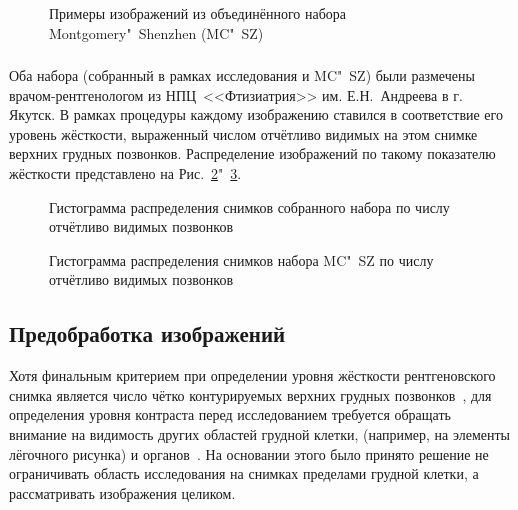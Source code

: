 \begin{figure}[ht]
	\caption{Примеры изображений из объединённого набора Montgomery"~Shenzhen (MC"~SZ)}
	\label{fig:samples-mc-sz}
\end{figure}

\subsubsection{}

Оба набора (собранный в рамках исследования и MC"~SZ) были размечены врачом-рентгенологом из НПЦ~<<Фтизиатрия>> им. Е.Н.~Андреева в г. Якутск. В рамках процедуры каждому изображению ставился в соответствие его уровень жёсткости, выраженный числом отчётливо видимых на этом снимке верхних грудных позвонков.  Распределение изображений по такому показателю жёсткости представлено на Рис.~\ref{fig:vertebrae-yak-hardness}"~\ref{fig:vertebrae-mc-sz}.

\begin{figure}[ht]
	\caption{Гистограмма распределения снимков собранного набора по числу отчётливо видимых позвонков}
	\label{fig:vertebrae-yak-hardness}
\end{figure}

\begin{figure}[ht]
	\caption{Гистограмма распределения снимков набора MC"~SZ по числу отчётливо видимых позвонков}
	\label{fig:vertebrae-mc-sz}
\end{figure}

\subsection{Предобработка изображений} \label{subsec:tb-hardness-preprocessing}

Хотя финальным критерием при определении уровня жёсткости рентгеновского снимка является число чётко контурируемых верхних грудных позвонков~\cite{тимофеева2013основные, сидоров2012методика}, для определения уровня контраста перед исследованием требуется обращать внимание на видимость других областей грудной клетки, (например, на элементы лёгочного рисунка) и органов~\cite{сидоров2012методика}. На основании этого было принято решение не ограничивать область исследования на снимках пределами грудной клетки, а рассматривать изображения целиком.

